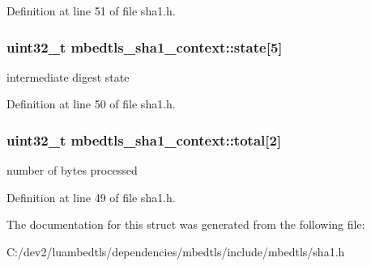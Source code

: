Definition at line 51 of file sha1.\-h.

\hypertarget{structmbedtls__sha1__context_af651fef2b175fced6b05aa196fe1f0c8}{
\subsubsection[{state}]{\setlength{\rightskip}{0pt plus 5cm}uint32\-\_\-t mbedtls\-\_\-sha1\-\_\-context\-::state\mbox{[}5\mbox{]}}}\label{structmbedtls__sha1__context_af651fef2b175fced6b05aa196fe1f0c8}
intermediate digest state 

Definition at line 50 of file sha1.\-h.

\hypertarget{structmbedtls__sha1__context_a19789ddfacc37f47eb34e26ae718997e}{
\subsubsection[{total}]{\setlength{\rightskip}{0pt plus 5cm}uint32\-\_\-t mbedtls\-\_\-sha1\-\_\-context\-::total\mbox{[}2\mbox{]}}}\label{structmbedtls__sha1__context_a19789ddfacc37f47eb34e26ae718997e}
number of bytes processed 

Definition at line 49 of file sha1.\-h.



The documentation for this struct was generated from the following file\-:\begin{DoxyCompactItemize}
\item 
C\-:/dev2/luambedtls/dependencies/mbedtls/include/mbedtls/sha1.\-h\end{DoxyCompactItemize}
